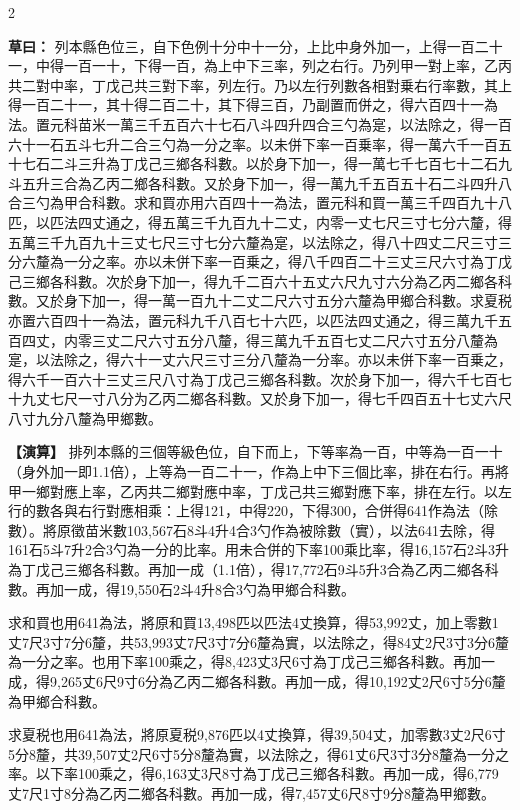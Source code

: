 \documentclass[11pt,a4paper]{article}
\newcommand{\ClassicalWorking}[1]{\par\noindent\textbf{草曰：}#1\par}
\newcommand{\ModernWorking}[1]{\par\noindent\textbf{【演算】}#1\par}
\begin{document}
\begin{paracol}{2}

\ClassicalWorking{%
列本縣色位三，自下色例十分中十一分，上比中身外加一，上得一百二十一，中得一百一十，下得一百，為上中下三率，列之右行。乃列甲一對上率，乙丙共二對中率，丁戊己共三對下率，列左行。乃以左行列數各相對乗右行率數，其上得一百二十一，其十得二百二十，其下得三百，乃副置而併之，得六百四十一為法。置元科苗米一萬三千五百六十七石八斗四升四合三勺為寔，以法除之，得一百六十一石五斗七升二合三勺為一分之率。以未併下率一百乗率，得一萬六千一百五十七石二斗三升為丁戊己三鄉各科數。以於身下加一，得一萬七千七百七十二石九斗五升三合為乙丙二鄉各科數。又於身下加一，得一萬九千五百五十石二斗四升八合三勺為甲合科數。求和買亦用六百四十一為法，置元科和買一萬三千四百九十八匹，以匹法四丈通之，得五萬三千九百九十二丈，内零一丈七尺三寸七分六釐，得五萬三千九百九十三丈七尺三寸七分六釐為寔，以法除之，得八十四丈二尺三寸三分六釐為一分之率。亦以未併下率一百乗之，得八千四百二十三丈三尺六寸為丁戊己三鄉各科數。次於身下加一，得九千二百六十五丈六尺九寸六分為乙丙二鄉各科數。又於身下加一，得一萬一百九十二丈二尺六寸五分六釐為甲鄉合科數。求夏税亦置六百四十一為法，置元科九千八百七十六匹，以匹法四丈通之，得三萬九千五百四丈，内零三丈二尺六寸五分八釐，得三萬九千五百七丈二尺六寸五分八釐為寔，以法除之，得六十一丈六尺三寸三分八釐為一分率。亦以未併下率一百乗之，得六千一百六十三丈三尺八寸為丁戊己三鄉各科數。次於身下加一，得六千七百七十九丈七尺一寸八分为乙丙二鄉各科數。又於身下加一，得七千四百五十七丈六尺八寸九分八釐為甲鄉數。}

\switchcolumn

\ModernWorking{%
排列本縣的三個等級色位，自下而上，下等率為一百，中等為一百一十（身外加一即1.1倍），上等為一百二十一，作為上中下三個比率，排在右行。再將甲一鄉對應上率，乙丙共二鄉對應中率，丁戊己共三鄉對應下率，排在左行。以左行的數各與右行對應相乘：上得121，中得220，下得300，合併得641作為法（除數）。將原徵苗米數103,567石8斗4升4合3勺作為被除數（實），以法641去除，得161石5斗7升2合3勺為一分的比率。用未合併的下率100乘比率，得16,157石2斗3升為丁戊己三鄉各科數。再加一成（1.1倍），得17,772石9斗5升3合為乙丙二鄉各科數。再加一成，得19,550石2斗4升8合3勺為甲鄉合科數。

求和買也用641為法，將原和買13,498匹以匹法4丈換算，得53,992丈，加上零數1丈7尺3寸7分6釐，共53,993丈7尺3寸7分6釐為實，以法除之，得84丈2尺3寸3分6釐為一分之率。也用下率100乘之，得8,423丈3尺6寸為丁戊己三鄉各科數。再加一成，得9,265丈6尺9寸6分為乙丙二鄉各科數。再加一成，得10,192丈2尺6寸5分6釐為甲鄉合科數。

求夏税也用641為法，將原夏税9,876匹以4丈換算，得39,504丈，加零數3丈2尺6寸5分8釐，共39,507丈2尺6寸5分8釐為實，以法除之，得61丈6尺3寸3分8釐為一分之率。以下率100乘之，得6,163丈3尺8寸為丁戊己三鄉各科數。再加一成，得6,779丈7尺1寸8分為乙丙二鄉各科數。再加一成，得7,457丈6尺8寸9分8釐為甲鄉數。
}

\end{paracol}
\end{document}
